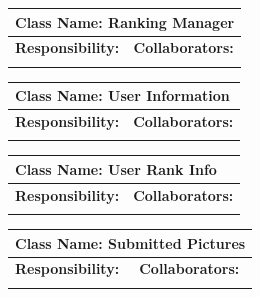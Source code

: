 \documentclass[]{article}
\begin{document}
\begin{itemize}
	\begin{table}
		\centering
		\begin{tabular}{|p{5cm}|p{5cm}|}
		\hline 
		 \multicolumn{2}{|l|}{\textbf{Class Name:} Ranking Manager} \\
		\hline
		\textbf{Responsibility:} & \textbf{Collaborators:} \\
		\hline
		\vspace{1in} & \\
		\hline
		\end{tabular}
	\end{table}

	\begin{table}
		\centering
		\begin{tabular}{|p{5cm}|p{5cm}|}
		\hline 
		 \multicolumn{2}{|l|}{\textbf{Class Name:} User Information} \\
		\hline
		\textbf{Responsibility:} & \textbf{Collaborators:} \\
		\hline
		\vspace{1in} & \\
		\hline
		\end{tabular}
	\end{table}

	\begin{table}
		\centering
		\begin{tabular}{|p{5cm}|p{5cm}|}
		\hline 
		 \multicolumn{2}{|l|}{\textbf{Class Name:} User Rank Info} \\
		\hline
		\textbf{Responsibility:} & \textbf{Collaborators:} \\
		\hline
		\vspace{1in} & \\
		\hline
		\end{tabular}
	\end{table}

	\begin{table}
		\centering
		\begin{tabular}{|p{5cm}|p{5cm}|}
		\hline 
		 \multicolumn{2}{|l|}{\textbf{Class Name:} Submitted Pictures} \\
		\hline
		\textbf{Responsibility:} & \textbf{Collaborators:} \\
		\hline
		\vspace{1in} & \\
		\hline
		\end{tabular}
	\end{table}


\end{itemize}
\end{document}
